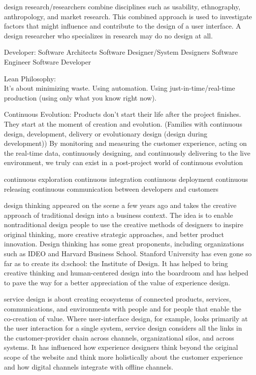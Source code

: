 {design research/researchers combine disciplines such as usability, ethnography, anthropology, and market research. This combined approach is used to investigate factors that might influence and contribute to the design of a user interface. A design researcher who specializes in research may do no design at all.

Developer:
Software Architects
Software Designer/System Designers
Software Engineer
Software Developer

Lean Philosophy:\\
It's about minimizing waste. Using automation. Using just-in-time/real-time production (using only what you know right now).

Continuous Evolution: 
Products don't start their life after the project finishes.\\
They start at the moment of creation and evolution.
(Families with continuous design, development, delivery or evolutionary design (design during development))
By monitoring and measuring the customer experience, acting on the real-time data, continuously designing, and continuously delivering to the live environment, we truly can exist in a post-project world of continuous evolution

continuous exploration
continuous integration
continuous deployment
continuous releasing
continuous communication between developers and customers

design thinking appeared on the scene a few years ago and takes the creative approach of traditional design into a business context. The idea is to enable nontraditional design people to use the creative methods of designers to inspire original thinking, more creative strategic approaches, and better product innovation. Design thinking has some great proponents, including organizations such as IDEO and Harvard Business School. Stanford University has even gone so far as to create its d:school: the Institute of Design.
It has helped to bring creative thinking and human-centered design into the boardroom and has helped to pave the way for a better appreciation of the value of experience design.

service design is about creating ecosystems of connected products, services, communications, and environments with people and for people that enable the co-creation of value. Where user-interface design, for example, looks primarily at the user interaction for a single system, service design considers all the links in the customer-provider chain across channels, organizational silos, and across systems. It has influenced how experience designers think beyond the original scope of the website and think more holistically about the customer experience and how digital channels integrate with offline channels.

}
